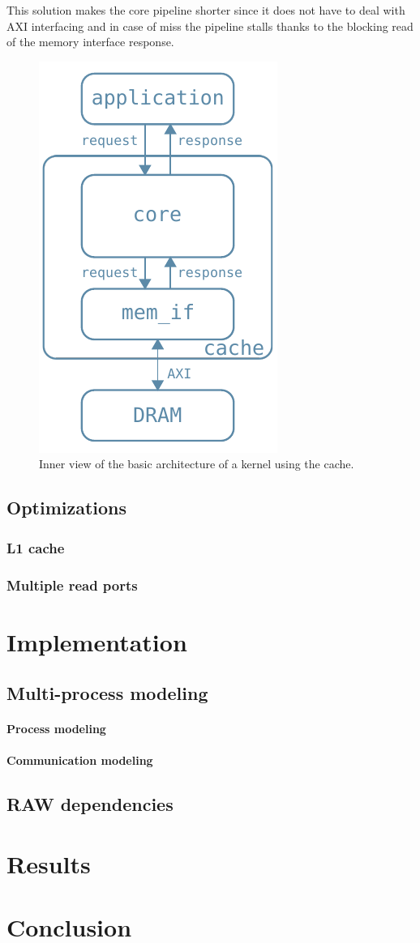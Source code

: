\documentclass[11pt,a4paper]{memoir}
\begin{document}
This solution makes the core pipeline shorter since it does not have to deal
with AXI interfacing and in case of miss the pipeline stalls thanks to the
blocking read of the memory interface response.

\begin{figure}
	\centering
	\includegraphics[width=.3\textwidth]{basic_arch_inner}
	\caption{Inner view of the basic architecture of a kernel using the cache.}
	\label{fig:basic_arch_inner}
\end{figure}

\section{Optimizations}
\subsection{L1 cache}
\subsection{Multiple read ports}

\chapter{Implementation}
\section{Multi-process modeling}
\subsubsection{Process modeling}
\subsubsection{Communication modeling}
\section{RAW dependencies}

\chapter{Results}
\chapter{Conclusion}
\end{document}

